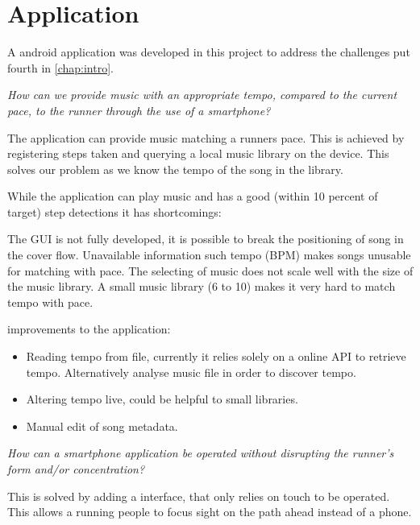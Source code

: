 \section{Application}
A android application was developed in this project to address the challenges put fourth in \cref{chap:intro}.

\begin{center}
\textit{How can we provide music with an appropriate tempo, compared to the current pace, to the runner through the use of a smartphone?}
\end{center}
The application can provide music matching a runners pace. This is achieved by registering steps taken and querying a local music library on the device. This solves our problem as we know the tempo of the song in the library.

While the application can play music and has a good (within 10 percent of target) step detections it has shortcomings: 

The GUI is not fully developed, it is possible to break the positioning of song in the cover flow. Unavailable information such tempo (BPM) makes songs unusable for matching with pace. The selecting of music does not scale well with the size of the music library. A small music library (6 to 10) makes it very hard to match tempo with pace. 

improvements to the application:
\begin{itemize}
\item Reading tempo from file, currently it relies solely on a online API to retrieve tempo.
\subitem Alternatively analyse music file in order to discover tempo.
\item Altering tempo live, could be helpful to small libraries.
\item Manual edit of song metadata. 
\end{itemize}


\begin{center}
\textit{How can a smartphone application be operated without disrupting the runner's form and/or concentration?}
\end{center}
This is solved by adding a interface, that only relies on touch to be operated. This allows a running people to focus sight on the path ahead instead of a phone. 






